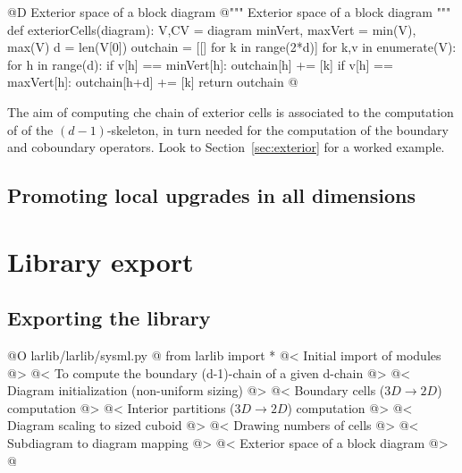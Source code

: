 \documentclass[11pt,oneside]{article}	%
\begin{document}
@D Exterior space of a block diagram
@{""" Exterior space of a block diagram """
def exteriorCells(diagram):
	V,CV = diagram
	minVert, maxVert = min(V), max(V)
	d = len(V[0])
	outchain = [[] for k in range(2*d)]
	for k,v in enumerate(V):
		for h in range(d):
			if v[h] == minVert[h]: outchain[h] += [k]
			if v[h] == maxVert[h]: outchain[h+d] += [k]
	return outchain
@}

The aim of computing che chain of exterior cells is associated to the computation of 
of the $(d-1)$-skeleton, in turn needed for the computation of the boundary and coboundary operators.
Look to Section~\ref{sec:exterior} for a worked example.



\subsection{Promoting local upgrades in all dimensions}



\section{Library export}
\subsection{Exporting the library}

@O larlib/larlib/sysml.py
@{
from larlib import *
@< Initial import of modules @>
@< To compute the boundary (d-1)-chain of a given d-chain @>
@< Diagram initialization (non-uniform sizing) @>
@< Boundary cells ($3D\to 2D$) computation @>
@< Interior partitions ($3D\to 2D$) computation @>
@< Diagram scaling to sized cuboid @>
@< Drawing numbers of cells @>
@< Subdiagram to diagram mapping @>
@< Exterior space of a block diagram @>
@}
\end{document}
